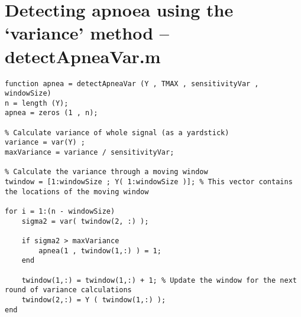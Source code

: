 \section{Detecting apnoea using the `variance' method -- detectApneaVar.m}
\label{sec:detectApneaVar}
\begin{lstlisting}
function apnea = detectApneaVar (Y , TMAX , sensitivityVar , windowSize)
n = length (Y);
apnea = zeros (1 , n);

% Calculate variance of whole signal (as a yardstick)
variance = var(Y) ;
maxVariance = variance / sensitivityVar;

% Calculate the variance through a moving window
twindow = [1:windowSize ; Y( 1:windowSize )]; % This vector contains the locations of the moving window

for i = 1:(n - windowSize)
    sigma2 = var( twindow(2, :) );
    
    if sigma2 > maxVariance 
        apnea(1 , twindow(1,:) ) = 1;
    end
    
    twindow(1,:) = twindow(1,:) + 1; % Update the window for the next round of variance calculations
    twindow(2,:) = Y ( twindow(1,:) );
end
\end{lstlisting}